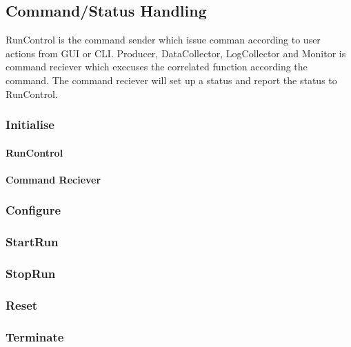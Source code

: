 \subsection{Command/Status Handling}
RunControl is the command sender which issue comman according to user actions from GUI or CLI. Producer, DataCollector, LogCollector and Monitor is command reciever which execuses the correlated function according the command. The command reciever will set up a status and report the status to RunControl.

\subsubsection{Initialise}
\paragraph{RunControl}

\paragraph{Command Reciever}

\subsubsection{Configure}


\subsubsection{StartRun}


\subsubsection{StopRun}


\subsubsection{Reset}


\subsubsection{Terminate}

